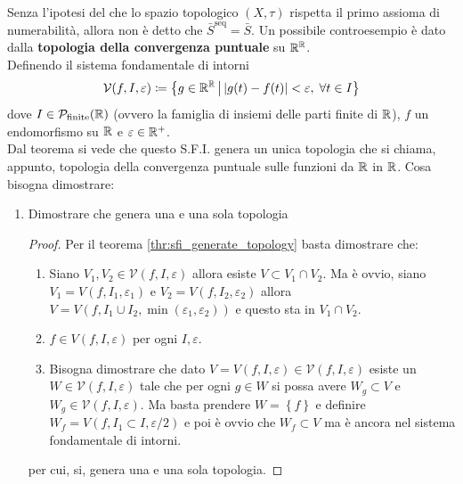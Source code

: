 \begin{remark}
	Senza l'ipotesi del che lo spazio topologico $(X,\tau)$ rispetta il primo assioma di numerabilità, allora non è detto che $\bar{S}^\text{seq} = \bar{S}$. Un possibile controesempio è dato dalla \textbf{topologia della convergenza puntuale} su $\mathbb{R}^{\mathbb{R}}$. \\
	Definendo il sistema fondamentale di intorni 
	\begin{equation*}
		\mathcal{V}(f, I, \varepsilon) \coloneqq \left\{ g \in \mathbb{R}^{\mathbb{R}} \,\middle|\,  |g(t) - f(t)| < \varepsilon, \; \forall t \in I \right\}
	\end{equation*}
	dove $I \in \mathcal{P}_\text{finite}(\mathbb{R})$ (ovvero la famiglia di insiemi delle parti finite di $\mathbb{R}$), $f$ un endomorfismo su $\mathbb{R}$ e $\varepsilon \in \mathbb{R}^+$. \\
	Dal teorema si vede che questo S.F.I. genera un unica topologia che si chiama, appunto, topologia della convergenza puntuale sulle funzioni da $\mathbb{R}$ in $\mathbb{R}$.
	Cosa bisogna dimostrare:
	\begin{enumerate}
		\item Dimostrare che genera una e una sola topologia 
		\begin{proof}
			Per il teorema \ref{thr:sfi_generate_topology} basta dimostrare che:
			\begin{enumerate}
				\item Siano $V_1, V_2 \in \mathcal{V}(f,I,\varepsilon)$ allora esiste $V \subset V_1 \cap V_2$. Ma è ovvio, siano $V_1 = V(f, I_1, \varepsilon_1)$ e $V_2 = V(f, I_2, \varepsilon_2)$ allora $V = V(f, I_1 \cup I_2, \min(\varepsilon_1, \varepsilon_2))$  e questo sta in $V_1 \cap V_2$.
				\item $f \in V(f, I, \varepsilon)$ per ogni $I, \varepsilon$.
				\item Bisogna dimostrare che dato $V = V(f, I, \varepsilon)\in \mathcal{V}(f,I,\varepsilon)$ esiste un $W \in \mathcal{V}(f,I,\varepsilon)$ tale che per ogni $g \in W$ si possa avere $W_g \subset V$ e $W_g \in \mathcal{V}(f,I, \varepsilon)$. Ma basta prendere $W = \left\{f\right\}$ e definire $W_f = V(f, I_1 \subset I, \varepsilon/2)$ e poi è ovvio che $W_f \subset V$ ma è ancora nel sistema fondamentale di intorni.
			\end{enumerate}
		per cui, si, genera una e una sola topologia.
		\end{proof}

\end{enumerate}
\end{remark}
